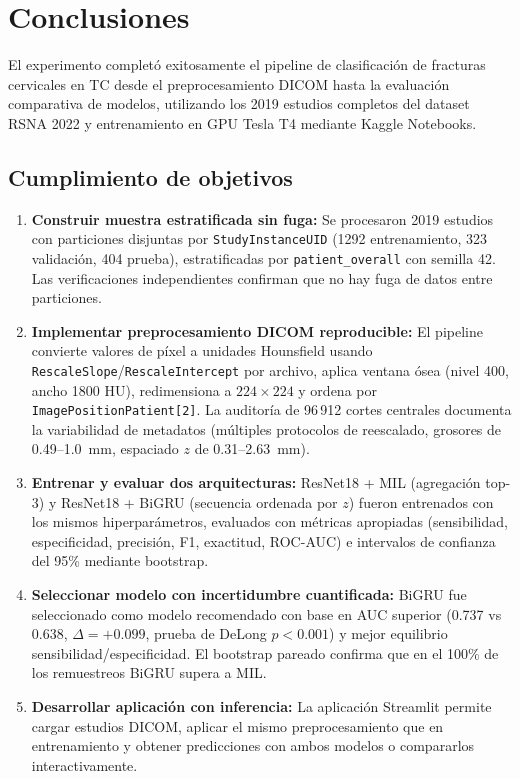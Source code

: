 \section{Conclusiones}

El experimento complet\'o exitosamente el pipeline de clasificaci\'on de fracturas cervicales en TC desde el preprocesamiento DICOM hasta la evaluaci\'on comparativa de modelos, utilizando los 2019 estudios completos del dataset RSNA 2022 y entrenamiento en GPU Tesla T4 mediante Kaggle Notebooks.

\subsection*{Cumplimiento de objetivos}

\begin{enumerate}[nosep]
\item \textbf{Construir muestra estratificada sin fuga:} Se procesaron 2019 estudios con particiones disjuntas por \texttt{StudyInstanceUID} (1292 entrenamiento, 323 validaci\'on, 404 prueba), estratificadas por \texttt{patient\_overall} con semilla 42. Las verificaciones independientes confirman que no hay fuga de datos entre particiones.

\item \textbf{Implementar preprocesamiento DICOM reproducible:} El pipeline convierte valores de p\'ixel a unidades Hounsfield usando \texttt{RescaleSlope}/\texttt{RescaleIntercept} por archivo, aplica ventana \'osea (nivel 400, ancho 1800 HU), redimensiona a $224\times224$ y ordena por \texttt{ImagePositionPatient[2]}. La auditor\'ia de 96\,912 cortes centrales documenta la variabilidad de metadatos (m\'ultiples protocolos de reescalado, grosores de 0.49--1.0~mm, espaciado $z$ de 0.31--2.63~mm).

\item \textbf{Entrenar y evaluar dos arquitecturas:} ResNet18 + MIL (agregaci\'on top-3) y ResNet18 + BiGRU (secuencia ordenada por $z$) fueron entrenados con los mismos hiperpar\'ametros, evaluados con m\'etricas apropiadas (sensibilidad, especificidad, precisi\'on, F1, exactitud, ROC-AUC) e intervalos de confianza del 95\% mediante bootstrap.

\item \textbf{Seleccionar modelo con incertidumbre cuantificada:} BiGRU fue seleccionado como modelo recomendado con base en AUC superior (0.737 vs 0.638, $\Delta = +0.099$, prueba de DeLong $p < 0.001$) y mejor equilibrio sensibilidad/especificidad. El bootstrap pareado confirma que en el 100\% de los remuestreos BiGRU supera a MIL.

\item \textbf{Desarrollar aplicaci\'on con inferencia:} La aplicaci\'on Streamlit permite cargar estudios DICOM, aplicar el mismo preprocesamiento que en entrenamiento y obtener predicciones con ambos modelos o compararlos interactivamente.
\end{enumerate}

